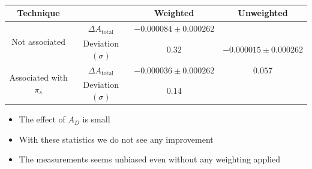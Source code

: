 \documentclass{beamer}
\begin{document}
\begin{frame}
      \frametitle{\insertsubsectionhead}
      \begin{center}
            \scriptsize
            \begin{tabular}{c|c|c|c}
                  Technique & & Weighted & Unweighted\\
                  \hline\hline
                  \multirow{2}{*}{Not associated} & $\Delta A_\text{total}$ & $-0.000084\pm 0.000262$& \\
                  & Deviation $(\sigma)$ & $0.32$& $-0.000015\pm 0.000262$\\
                  \cline{1-3}
                  \multirow{2}{*}{Associated with $\pi_s$} & $\Delta A_\text{total}$ & $-0.000036\pm 0.000262$& $0.057$\\
                  & Deviation $(\sigma)$ & $0.14$& \\
            \end{tabular}
      \end{center}
      \normalsize
      \begin{itemize}
            \item The effect of $A_D$ is small
            \item With these statistics we do not see any improvement
            \item The measurements seems unbiased even without any weighting applied
      \end{itemize}
\end{frame}
\end{document}
